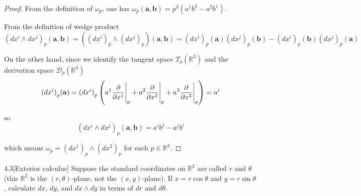 \begin{proof}
    From the definition of \(\omega_{p}\), one has \(\omega_{p}(\mathbf{a}, \mathbf{b}) = p^{3}(a^{1}b^{2} - a^{2}b^{1})\).

    From the definition of wedge product
    \[
        {(dx^{i} \wedge dx^{j})}_{p}(\mathbf{a}, \mathbf{b}) = ({(dx^{i})}_{p} \wedge {(dx^{j})}_{p})(\mathbf{a}, \mathbf{b}) = {(dx^{i})}_{p}(\mathbf{a}) {(dx^{j})}_{p}(\mathbf{b}) - {(dx^{i})}_{p}(\mathbf{b}) {(dx^{j})}_{p}(\mathbf{a})
    \]

    On the other hand, since we identify the tangent space \( T_{p}(\mathbb{R}^{3}) \) and the derivation space \( \mathscr{D}_{p}(\mathbb{R}^{3}) \)
    \[
        {(dx^{i})}_{p}(\mathbf{a}) = {(dx^{i})}_{p}\left(a^{1}\frac{\partial}{\partial x^{1}}\Bigg{\vert}_{p} + a^{2}\frac{\partial}{\partial x^{2}}\Bigg{\vert}_{p} + a^{3}\frac{\partial}{\partial x^{3}}\Bigg{\vert}_{p}\right) = a^{i}
    \]

    so
    \[
        {(dx^{i} \wedge dx^{j})}_{p}(\mathbf{a}, \mathbf{b}) = a^{i}b^{j} - a^{j}b^{i}
    \]

    which means \( \omega_{p} = {(dx^{1})}_{p} \wedge {(dx^{2})}_{p} \) for each \(p\in \mathbb{R}^{3}\).
\end{proof}

\begin{problem}{4.3}[Exterior calculus]
Suppose the standard coordinates on \(\mathbb{R}^{2}\) are called \(r\) and \(\theta\) (this \(\mathbb{R}^{2}\) is the \((r,\theta)\)-plane, not the \((x,y)\)-plane). If \(x = r\cos\theta\) and \(y = r\sin\theta\), calculate \(dx\), \(dy\), and \(dx \wedge dy\) in terms of \(dr\) and \(d\theta\).
\end{problem}

